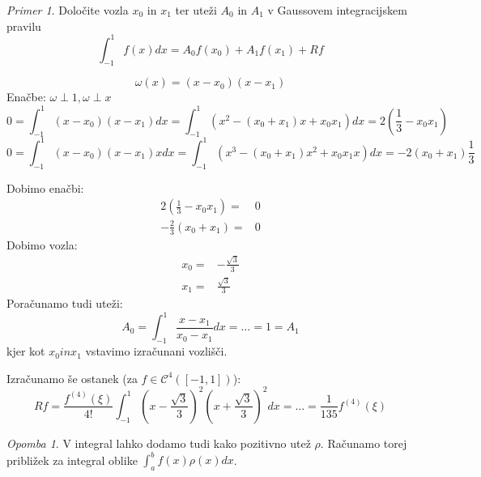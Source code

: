 \documentclass[a4paper,12pt]{article}
\theoremstyle{definition}
\theoremstyle{remark}
\newtheorem*{ex}{Primer}
\newtheorem*{rem}{Opomba}
\begin{document}
\begin{ex}
    Določite vozla $x_0$ in $x_1$ ter uteži $A_0$ in $A_1$ v Gaussovem integracijskem pravilu
    \begin{equation*}
        \int_{-1}^{1} f(x) dx = A_0 f(x_0) + A_1 f(x_1) + Rf
    \end{equation*}

    \begin{equation*}
        \omega(x) = (x-x_0)(x-x_1)
    \end{equation*}
    Enačbe: $\omega \perp 1, \omega \perp x$
    \begin{equation*}
        0 = \int_{-1}^{1}(x-x_0)(x-x_1) dx = \int_{-1}^{1} (x^2 - (x_0 + x_1) x + x_0x_1) dx = 2(\frac{1}{3} - x_0x_1)
    \end{equation*}
    \begin{equation*}
        0 = \int_{-1}^{1}(x-x_0)(x-x_1)x dx = \int_{-1}^{1} (x^3 - (x_0 + x_1) x^2 + x_0x_1x) dx = -2(x_0 + x_1) \frac{1}{3}
    \end{equation*}

    Dobimo enačbi:
    \begin{align*}
        2(\frac{1}{3} - x_0x_1) =& 0\\
        - \frac{2}{3}(x_0 + x_1) =& 0
    \end{align*}
    Dobimo vozla:
    \begin{align*}
        x_0 =& - \frac{\sqrt{3}}{3} \\
        x_1 =& \frac{\sqrt{3}}{3}
    \end{align*}
    Poračunamo tudi uteži:
    \begin{equation*}
        A_0 = \int_{-1}^{1} \frac{x-x_1}{x_0-x_1} dx = \dots = 1 = A_1
    \end{equation*}
    kjer kot $x_0 in x_1$ vstavimo izračunani vozlišči.

    Izračunamo še ostanek (za $f \in \mathscr{C}^4([-1, 1])$):
    \begin{equation*}
        Rf = \frac{f^{(4)} (\xi)}{4!} \int_{-1}^{1} (x-\frac{\sqrt{3}}{3})^2 (x + \frac{\sqrt{3}}{3})^2 dx = \dots = \frac{1}{135} f^{(4)} (\xi)
    \end{equation*}
\end{ex}

\begin{rem}
    V integral lahko dodamo tudi kako pozitivno utež $\rho$. Računamo torej približek za integral oblike $\int_{a}^{b} f(x) \rho(x) dx$.
\end{rem}
\end{document}
